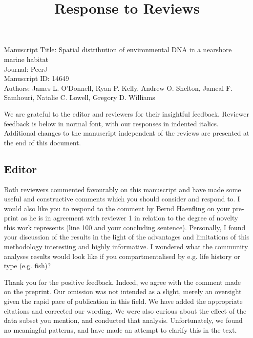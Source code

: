 \documentclass{article}
\title{Response to Reviews}
\newenvironment{response}
	{
	\begin{adjustwidth}{1cm}{0cm}
	\itshape %
	}
	{
	\end{adjustwidth}
	}
\begin{document}
\maketitle


\noindent
{
Manuscript Title:
Spatial distribution of environmental DNA in a nearshore marine habitat
\\
Journal:
PeerJ
\\
Manuscript ID:
14649
\\
Authors:
James L. O'Donnell,
Ryan P. Kelly,
Andrew O. Shelton,
Jameal F. Samhouri,
Natalie C. Lowell,
Gregory D. Williams
\\
}

We are grateful to the editor and reviewers for their insightful feedback.
Reviewer feedback is below in normal font, with our responses in indented italics.
Additional changes to the manuscript independent of the reviews are presented at the end of this document.

\subsection*{Editor}
Both reviewers commented favourably on this manuscript and have made some useful and constructive comments which you should consider and respond to. I would also like you to respond to the comment by Bernd Haenfling on your pre-print as he is in agreement with reviewer 1 in relation to the degree of novelty this work represents (line 100 and your concluding sentence). Personally, I found your discussion of the results in the light of the advantages and limitations of this methodology interesting and highly informative. I wondered what the community analyses results would look like if you compartmentalised by e.g. life history or type (e.g. fish)?

\begin{response}
  Thank you for the positive feedback.
	Indeed, we agree with the comment made on the preprint. Our omission was not intended as a slight, merely an oversight given the rapid pace of publication in this field.
	We have added the appropriate citations and corrected our wording.
	We were also curious about the effect of the data subset you mention, and conducted that analysis. Unfortunately, we found no meaningful patterns, and have made an attempt to clarify this in the text.
	\\
\end{response}
\end{document}
